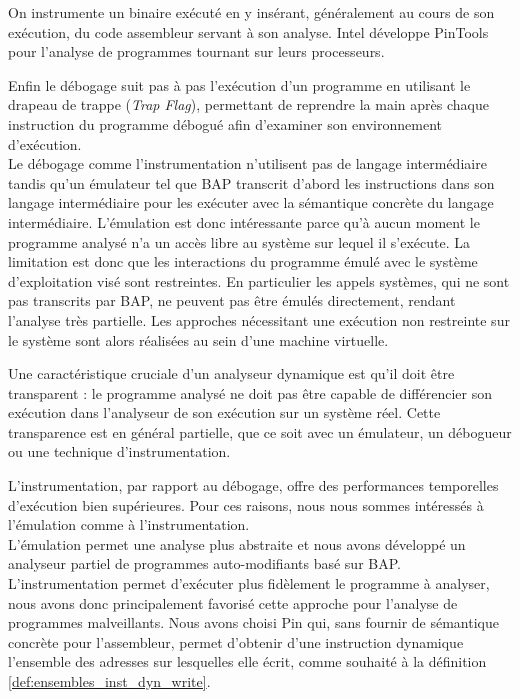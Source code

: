On instrumente un binaire exécuté en y insérant, généralement au cours de son exécution, du code assembleur servant à son analyse. Intel développe PinTools \cite{pintools} pour l'analyse de programmes tournant sur leurs processeurs.

Enfin le débogage suit pas à pas l'exécution d'un programme en utilisant le drapeau de trappe (\emph{Trap Flag}), permettant de reprendre la main après chaque instruction du programme débogué afin d'examiner son environnement d'exécution.
\\

Le débogage comme l'instrumentation n'utilisent pas de langage intermédiaire tandis qu'un émulateur tel que BAP transcrit d'abord les instructions dans son langage intermédiaire pour les exécuter avec la sémantique concrète du langage intermédiaire.
L'émulation est donc intéressante parce qu'à aucun moment le programme analysé n'a un accès libre au système sur lequel il s'exécute.
La limitation est donc que les interactions du programme émulé avec le système d'exploitation visé sont restreintes.
En particulier les appels systèmes, qui ne sont pas transcrits par BAP, ne peuvent pas être émulés directement, rendant l'analyse très partielle.
Les approches nécessitant une exécution non restreinte sur le système sont alors réalisées au sein d'une machine virtuelle.

Une caractéristique cruciale d'un analyseur dynamique est qu'il doit être transparent : le programme analysé ne doit pas être capable de différencier son exécution dans l'analyseur de son exécution sur un système réel.
Cette transparence est en général partielle, que ce soit avec un émulateur, un débogueur ou une technique d'instrumentation. 

L'instrumentation, par rapport au débogage, offre des performances temporelles d'exécution bien supérieures.
Pour ces raisons, nous nous sommes intéressés à l'émulation comme à l'instrumentation.
\\

L'émulation permet une analyse plus abstraite et nous avons développé un analyseur partiel de programmes auto-modifiants basé sur BAP.
L'instrumentation permet d'exécuter plus fidèlement le programme à analyser, nous avons donc principalement favorisé cette approche pour l'analyse de programmes malveillants. Nous avons choisi Pin qui, sans fournir de sémantique concrète pour l'assembleur, permet d'obtenir d'une instruction dynamique l'ensemble des adresses sur lesquelles elle écrit, comme souhaité à la définition \ref{def:ensembles_inst_dyn_write}.

